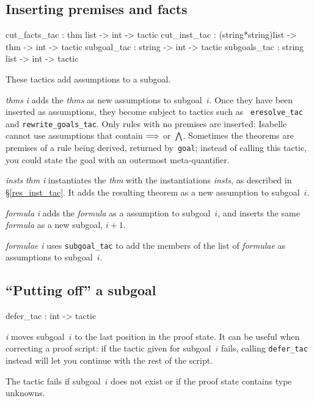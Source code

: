 \subsection{Inserting premises and facts}\label{cut_facts_tac}
\begin{ttbox} 
cut_facts_tac : thm list -> int -> tactic
cut_inst_tac  : (string*string)list -> thm -> int -> tactic
subgoal_tac   : string -> int -> tactic
subgoals_tac  : string list -> int -> tactic
\end{ttbox}
These tactics add assumptions to a subgoal.
\begin{ttdescription}
\item[\ttindexbold{cut_facts_tac} {\it thms} {\it i}] 
  adds the {\it thms} as new assumptions to subgoal~$i$.  Once they have
  been inserted as assumptions, they become subject to tactics such as {\tt
    eresolve_tac} and {\tt rewrite_goals_tac}.  Only rules with no premises
  are inserted: Isabelle cannot use assumptions that contain $\Longrightarrow$
  or~$\bigwedge$.  Sometimes the theorems are premises of a rule being
  derived, returned by~{\tt goal}; instead of calling this tactic, you
  could state the goal with an outermost meta-quantifier.

\item[\ttindexbold{cut_inst_tac} {\it insts} {\it thm} {\it i}]
  instantiates the {\it thm} with the instantiations {\it insts}, as
  described in {\S}\ref{res_inst_tac}.  It adds the resulting theorem as a
  new assumption to subgoal~$i$. 

\item[\ttindexbold{subgoal_tac} {\it formula} {\it i}] 
adds the {\it formula} as a assumption to subgoal~$i$, and inserts the same
{\it formula} as a new subgoal, $i+1$.

\item[\ttindexbold{subgoals_tac} {\it formulae} {\it i}] 
  uses {\tt subgoal_tac} to add the members of the list of {\it
    formulae} as assumptions to subgoal~$i$. 
\end{ttdescription}


\subsection{``Putting off'' a subgoal}
\begin{ttbox} 
defer_tac : int -> tactic
\end{ttbox}
\begin{ttdescription}
\item[\ttindexbold{defer_tac} {\it i}] 
  moves subgoal~$i$ to the last position in the proof state.  It can be
  useful when correcting a proof script: if the tactic given for subgoal~$i$
  fails, calling {\tt defer_tac} instead will let you continue with the rest
  of the script.

  The tactic fails if subgoal~$i$ does not exist or if the proof state
  contains type unknowns. 
\end{ttdescription}


